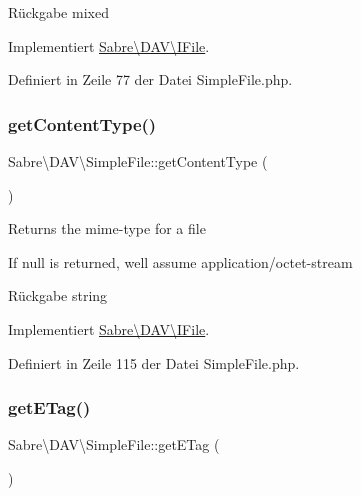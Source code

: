 \begin{DoxyReturn}{Rückgabe}
mixed 
\end{DoxyReturn}


Implementiert \mbox{\hyperlink{interface_sabre_1_1_d_a_v_1_1_i_file_a3102812af0567c3cfd9cd6c20104bd27}{Sabre\textbackslash{}\+D\+A\+V\textbackslash{}\+I\+File}}.



Definiert in Zeile 77 der Datei Simple\+File.\+php.

\mbox{\label{class_sabre_1_1_d_a_v_1_1_simple_file_af7db06a30e0b3557c488d2608a2c0523}} 
\subsubsection{\texorpdfstring{get\+Content\+Type()}{getContentType()}}
{\footnotesize\ttfamily Sabre\textbackslash{}\+D\+A\+V\textbackslash{}\+Simple\+File\+::get\+Content\+Type (\begin{DoxyParamCaption}{ }\end{DoxyParamCaption})}

Returns the mime-\/type for a file

If null is returned, we\textquotesingle{}ll assume application/octet-\/stream \begin{DoxyReturn}{Rückgabe}
string 
\end{DoxyReturn}


Implementiert \mbox{\hyperlink{interface_sabre_1_1_d_a_v_1_1_i_file_aa76147e3e0ad228026dcb03035b499bc}{Sabre\textbackslash{}\+D\+A\+V\textbackslash{}\+I\+File}}.



Definiert in Zeile 115 der Datei Simple\+File.\+php.

\mbox{\label{class_sabre_1_1_d_a_v_1_1_simple_file_ac6706a1b6c9d029f253c6df2b6616f11}} 
\subsubsection{\texorpdfstring{get\+E\+Tag()}{getETag()}}
{\footnotesize\ttfamily Sabre\textbackslash{}\+D\+A\+V\textbackslash{}\+Simple\+File\+::get\+E\+Tag (\begin{DoxyParamCaption}{ }\end{DoxyParamCaption})}

